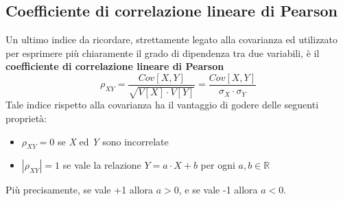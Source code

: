 \subsection{Coefficiente di correlazione lineare di Pearson}
Un ultimo indice da ricordare, strettamente legato alla covarianza ed utilizzato per esprimere più chiaramente il grado di dipendenza tra due variabili, è il \textbf{coefficiente di correlazione lineare di Pearson}
\begin{equation}
	\rho_{XY} = \frac{Cov[X,Y]}{\sqrt{V[X] \cdot V[Y]}} = \frac{Cov[X,Y]}{\sigma_X \cdot \sigma_Y}
\end{equation}
Tale indice rispetto alla covarianza ha il vantaggio di godere delle seguenti proprietà:
\begin{itemize}
	\item $\rho_{XY} = 0 $ se \textit{X} ed \textit{Y} sono incorrelate
	\item $|\rho_{XY}| = 1$ se vale la relazione $Y = a \cdot X + b$ per ogni $a, b \in \mathbb{R}$
\end{itemize}
Più precisamente, se vale +1 allora $a>0$, e se vale -1 allora $a<0$.